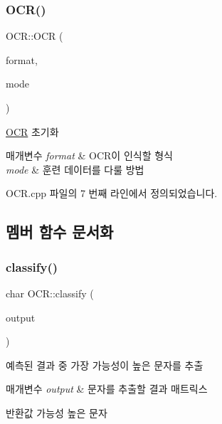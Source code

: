 \subsubsection{\texorpdfstring{O\+C\+R()}{OCR()}}
{\footnotesize\ttfamily O\+C\+R\+::\+O\+CR (\begin{DoxyParamCaption}\item[{const F\+O\+R\+M\+AT}]{format,  }\item[{const int}]{mode }\end{DoxyParamCaption})}



\hyperlink{class_o_c_r}{O\+CR} 초기화 


\begin{DoxyParams}{매개변수}
{\em format} & O\+C\+R이 인식할 형식 \\
\hline
{\em mode} & 훈련 데이터를 다룰 방법 \\
\hline
\end{DoxyParams}


O\+C\+R.\+cpp 파일의 7 번째 라인에서 정의되었습니다.



\subsection{멤버 함수 문서화}
\mbox{\label{class_o_c_r_a3d521746f28d2843381c7d7e5eedddcd}} 
\subsubsection{\texorpdfstring{classify()}{classify()}}
{\footnotesize\ttfamily char O\+C\+R\+::classify (\begin{DoxyParamCaption}\item[{cv\+::\+Mat $\ast$}]{output }\end{DoxyParamCaption})}



예측된 결과 중 가장 가능성이 높은 문자를 추출 


\begin{DoxyParams}{매개변수}
{\em output} & 문자를 추출할 결과 매트릭스 \\
\hline
\end{DoxyParams}
\begin{DoxyReturn}{반환값}
가능성 높은 문자 
\end{DoxyReturn}


